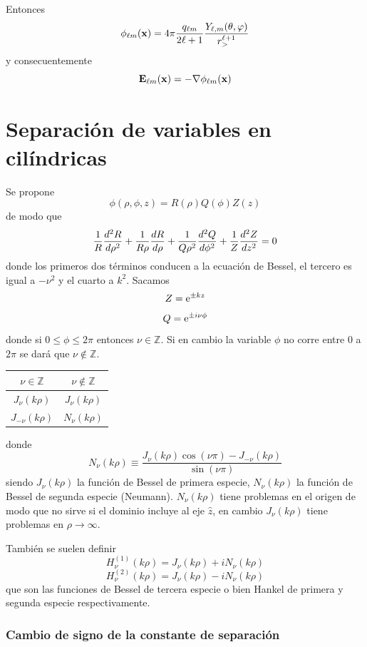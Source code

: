 \documentclass[10pt,oneside]{CBFT_book}
\begin{document}
Entonces
\[
	\phi_{\ell m}(\vb{x})= 4\pi \frac{q_{\ell m}}{2\ell+1}\frac{Y_{\ell,m}(\theta,\varphi) }{r_>^{\ell+1}}
\]
y consecuentemente
\[
	\vb{E}_{\ell m}(\vb{x}) = - \Nabla \phi_{\ell m}(\vb{x})
\]

\section{Separación de variables en cilíndricas}

Se propone
\[
	\phi(\rho,\phi,z) = R(\rho) Q(\phi) Z(z)
\]
de modo que
\[
	\frac{1}{R} \dtot[2]{R}{\rho} + \frac{1}{R\rho} \dtot{R}{\rho} + \frac{1}{Q\rho^2} \dtot[2]{Q}{\phi} 
				+ \frac{1}{Z} \dtot[2]{Z}{z} = 0
\]
donde los primeros dos términos conducen a la ecuación de Bessel, el tercero es igual a $-\nu^2$ y el
cuarto a $k^2$. Sacamos
\[
	Z = \euler^{\pm kz}
\]
\[
	Q = \euler^{\pm i \nu \phi}
\]
donde si $0\leq \phi \leq 2\pi$ entonces $\nu \in \mathbb{Z}$. Si en cambio la variable $\phi$ no corre 
entre $0$ a $2\pi$ se dará que $\nu \notin \mathbb{Z}$.

\begin{center}
	\begin{tabular}{|c|c|}
	\hline
	$ \nu \in \mathbb{Z} $ & $ \nu \notin \mathbb{Z}  $ \\
	\hline
	$J_\nu(k\rho)$ & $J_\nu(k\rho)$ \\
	$J_{-\nu}(k\rho)$ & $N_\nu(k\rho)$ \\
	\hline
	\end{tabular} 
\end{center}
donde 
\[
	N_\nu(k\rho) \equiv \frac{ J_\nu(k\rho) \cos(\nu\pi) - J_{-\nu}(k\rho)}{\sin(\nu\pi)}
\]
siendo $J_\nu(k\rho)$ la función de Bessel de primera especie, $N_\nu(k\rho)$ la función de Bessel de segunda 
especie (Neumann).
$N_\nu(k\rho)$ tiene problemas en el origen de modo que no sirve si el dominio incluye al eje $\hat{z}$, en 
cambio $J_\nu(k\rho)$ tiene problemas en $\rho\to \infty$.

También se suelen definir
\[
	H^{(1)}_\nu(k\rho) = J_\nu(k\rho) + i N_\nu(k\rho)
\]
\[
	H^{(2)}_\nu(k\rho) = J_\nu(k\rho) - i N_\nu(k\rho)
\]
que son las funciones de Bessel de tercera especie o bien Hankel de primera y segunda especie respectivamente.

\subsubsection{Cambio de signo de la constante de separación}
\end{document}
